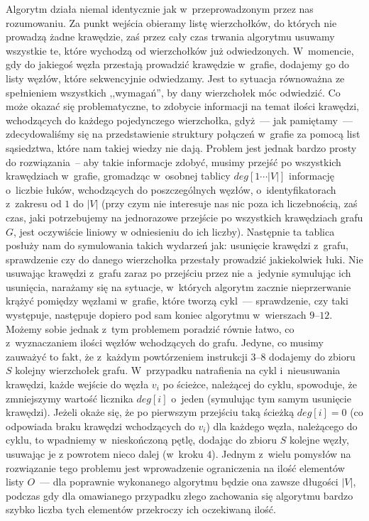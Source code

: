 Algorytm działa niemal identycznie jak w~przeprowadzonym przez nas rozumowaniu. Za punkt wejścia obieramy listę wierzchołków, do których nie prowadzą żadne krawędzie, zaś przez cały czas trwania algorytmu usuwamy wszystkie te, które wychodzą od wierzchołków już odwiedzonych. W~momencie, gdy do jakiegoś węzła przestają prowadzić krawędzie w~grafie, dodajemy go do listy węzłów, które sekwencyjnie odwiedzamy. Jest to sytuacja równoważna ze spełnieniem wszystkich ,,wymagań'', by dany wierzchołek móc odwiedzić. Co może okazać się problematyczne, to zdobycie informacji na temat ilości krawędzi, wchodzących do każdego pojedynczego wierzchołka, gdyż~--- jak pamiętamy~--- zdecydowaliśmy się na przedstawienie struktury połączeń w~grafie za pomocą list sąsiedztwa, które nam takiej wiedzy nie dają. Problem jest jednak bardzo prosty do rozwiązania~--  aby takie informacje zdobyć, musimy przejść po wszystkich krawędziach w~grafie, gromadząc w~osobnej tablicy $deg \left[1 \cdots \left| V \right| \right]$ informację o~liczbie łuków, wchodzących do poszczególnych węzłów, o~identyfikatorach z~zakresu od $1$ do $\left| V \right|$ (przy czym nie interesuje nas nic poza ich liczebnością, zaś czas, jaki potrzebujemy na jednorazowe przejście po wszystkich krawędziach grafu $G$, jest oczywiście liniowy w odniesieniu do ich liczby). Następnie ta tablica posłuży nam do symulowania takich wydarzeń jak: usunięcie krawędzi z~grafu, sprawdzenie czy do danego wierzchołka przestały prowadzić jakiekolwiek łuki. Nie usuwając krawędzi z~grafu zaraz po przejściu przez nie a~jedynie symulując ich usunięcia, narażamy się na sytuacje, w~których algorytm zacznie nieprzerwanie krążyć pomiędzy węzłami w~grafie, które tworzą cykl~--- sprawdzenie, czy taki występuje, następuje dopiero pod sam koniec algorytmu w~wierszach $9$--$12$. Możemy sobie jednak z~tym problemem poradzić równie łatwo, co z~wyznaczaniem ilości węzłów wchodzących do grafu. Jedyne, co musimy zauważyć to fakt, że z~każdym powtórzeniem instrukcji $3$--$8$ dodajemy do zbioru $S$ kolejny wierzchołek grafu. W~przypadku natrafienia na cykl i~nieusuwania krawędzi, każde wejście do węzła $v_{i}$ po ścieżce, należącej do cyklu, spowoduje, że zmniejszymy wartość licznika $deg \left[ i \right]$ o~jeden (symulując tym samym usunięcie krawędzi). Jeżeli okaże się, że po pierwszym przejściu taką ścieżką $deg \left[ i \right] = 0 $ (co odpowiada braku krawędzi wchodzących do $v_{i}$) dla każdego węzła, należącego do cyklu, to wpadniemy w~nieskończoną pętlę, dodając do zbioru $S$ kolejne węzły, usuwając je z powrotem nieco dalej (w~kroku $4$). Jednym z~wielu pomysłów na rozwiązanie tego problemu jest wprowadzenie ograniczenia na ilość elementów listy $O$~--- dla poprawnie wykonanego algorytmu będzie ona zawsze długości $ \left| V \right| $, podczas gdy dla omawianego przypadku złego zachowania się algorytmu bardzo szybko liczba tych elementów przekroczy ich oczekiwaną ilość.

